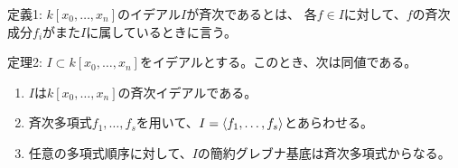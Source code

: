 \begin{framed}
  定義1:
  $k[x_0,\dots,x_n]$のイデアル$I$が斉次であるとは、
  各$f\in I$に対して、$f$の斉次成分$f_i$がまた$I$に属しているときに言う。
\end{framed}

\begin{framed}
  定理2:
  $I\subset k[x_0,\dots,x_n]$をイデアルとする。このとき、次は同値である。
  \begin{enumerate}[label=(\roman*)]
    \item $I$は$k[x_0,\dots,x_n]$の斉次イデアルである。
    \item
    斉次多項式$f_1,\dots,f_s$を用いて、$I=\left\langle f_1,\dots,f_s \right\rangle$とあらわせる。
    \item
    任意の多項式順序に対して、$I$の簡約グレブナ基底は斉次多項式からなる。
  \end{enumerate}
\end{framed}
